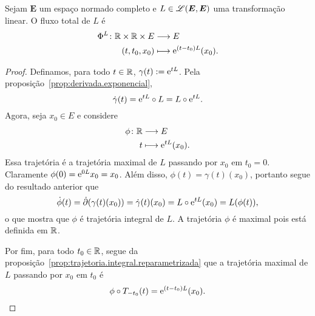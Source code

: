 \begin{proposition}
Sejam $\bm E$ um espaço normado completo e $L \in \toplin(\bm E, \bm E)$ uma transformação linear. O fluxo total de $L$ é
	\begin{align*}
	\func{\Flux[L]}{\R \times \R \times E}{E}{(t,t_0,x_0)}{\e^{(t-t_0)L}(x_0)}.
	\end{align*}
\end{proposition}
\begin{proof}
Definamos, para todo $t \in \R$, $\gamma(t) := \e^{tL}$. Pela proposição~\ref{prop:derivada.exponencial},
	\begin{equation*}
	\dot\gamma(t) = \e^{tL} \circ L = L \circ \e^{tL}.
	\end{equation*}
Agora, seja $x_0 \in E$ e considere
	\begin{align*}
	\func{\phi}{\R}{E}{t}{\e^{tL}(x_0)}.
	\end{align*}
Essa trajetória é a trajetória maximal de $L$ passando por $x_0$ em $t_0 = 0$. Claramente $\phi(0) = \e^{0L}x_0 = x_0$. Além disso, $\phi(t) = \gamma(t)(x_0)$, portanto segue do resultado anterior que
	\begin{equation*}
	\dot\phi(t) = \der(\gamma(t)(x_0)) = \dot \gamma(t)(x_0) = L \circ \e^{tL} (x_0) = L(\phi(t)),
	\end{equation*}
o que mostra que $\phi$ é trajetória integral de $L$. A trajetória $\phi$ é maximal pois está definida em $\R$.

Por fim, para todo $t_0 \in \R$, segue da proposição~\ref{prop:trajetoria.integral.reparametrizada} que a trajetória maximal de $L$ passando por $x_0$ em $t_0$ é
	\begin{equation*}
	\phi \circ T_{-t_0}(t) = \e^{(t-t_0)L}(x_0).
	\qedhere
	\end{equation*}
\end{proof}

